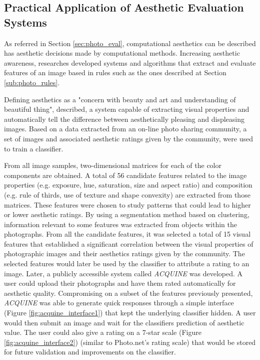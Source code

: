 \subsection{Practical Application of Aesthetic Evaluation Systems}
\label{sub:eval_applications}

As referred in Section \ref{sec:photo_eval}, computational aesthetics can be described has aesthetic decisions made by computational methods. Increasing aesthetic awareness, researches developed systems and algorithms that extract and evaluate features of an image based in rules such as the ones described at Section \ref{sub:photo_rules}.

Defining aesthetics as a "concern with beauty and art and understanding of beautiful thing", \citeauthor{datta2006studying} \cite{datta2006studying} described, a system capable of extracting visual properties and automatically tell the difference between aesthetically pleasing and displeasing images. 
Based on a data extracted from an on-line photo sharing community, a set of images and associated aesthetic ratings given by the community, were used to train a classifier.

From all image samples, two-dimensional matrices for each of the color components are obtained. A total of 56 candidate features related to the image properties (e.g. exposure, hue, saturation, size and aspect ratio) and composition (e.g. rule of thirds, use of texture and shape convexity) are extracted from those matrices. 
These features were chosen to study patterns that could lead to higher or lower aesthetic ratings. By using a segmentation method based on clustering, information relevant to some features was extracted from objects within the photographs.
From all the candidate features, it was selected a total of 15 visual features that established a significant correlation between the visual properties of photographic images and their aesthetics ratings given by the community. The selected features would later be used by the classifier to attribute a rating to an image.
Later, a publicly accessible system called \emph{ACQUINE} \cite{datta2010acquine} was developed. A user could upload their photographs and have them rated automatically for aesthetic quality. Compromising on a subset of the features previously presented, \emph{ACQUINE} was able to generate quick responses through a simple interface (Figure \ref{fig:acquine_interface1}) that kept the underlying classifier hidden. A user would then submit an image and wait for the classifiers prediction of aesthetic value. The user could also give a rating on a 7-star scale (Figure \ref{fig:acquine_interface2}) (similar to Photo.net's rating scale) that would be stored for future validation and improvements on the classifier.

